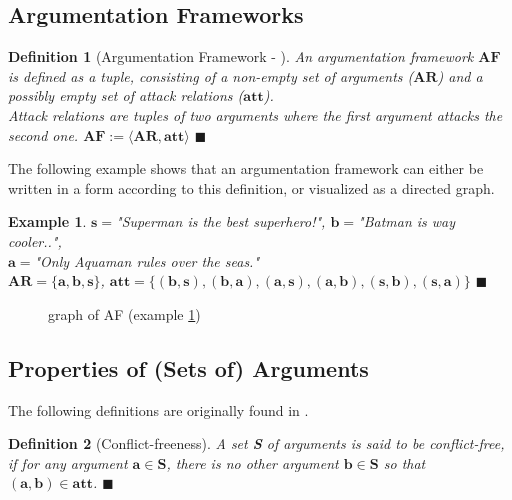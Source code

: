\documentclass[12pt]{report}
\numberwithin{figure}{chapter}
\theoremstyle{break}
\newtheorem{defn}{Definition}[chapter]
\newtheorem{exmpl}{Example}[chapter]
\newenvironment{mydefn}{\begin{defn}}{$\blacksquare$ \end{defn}}
\newenvironment{myexmpl}{\begin{exmpl}}{$\blacksquare$ \end{exmpl}}
\begin{document}
\subsection{Argumentation Frameworks}
\begin{mydefn}[Argumentation Framework - \cite{Dung}]
An argumentation framework $\bm{AF}$ is defined as a tuple, consisting of a non-empty set of arguments ($\bm{AR}$) and a possibly empty set of attack relations ($\bm{att}$).\\
Attack relations are tuples of two arguments where the first argument attacks the second one.
$\bm{AF:=\langle AR,att \rangle}$
\end{mydefn}

The following example shows that an argumentation framework can either be written in a form according to this definition, or visualized as a directed graph.

\newpage

\begin{myexmpl}
$\bm{s=}$"Superman is the best superhero!", $\bm{b=}$"Batman is way cooler..",\\$\bm{a=}$"Only Aquaman rules over the seas."\\
$\bm{AR = \{a,b,s\}}$, $\bm{att=\{(b,s),(b,a),(a,s),(a,b),(s,b),(s,a)\}}$
\label{a b s}
\end{myexmpl}

\begin{figure}[h!]
\begin{center}\end{center}
\caption{graph of AF (example \ref{a b s})}
\end{figure}

\subsection{Properties of (Sets of) Arguments}

The following definitions are originally found in \cite{Dung}.

\begin{mydefn}[Conflict-freeness]
A set \textbf{S} of arguments is said to be conflict-free, if for any argument $\bm{a \in S}$, there is no other argument $\bm{b \in S}$ so that $\bm{(a,b) \in att}$.
\end{mydefn}
\end{document}
